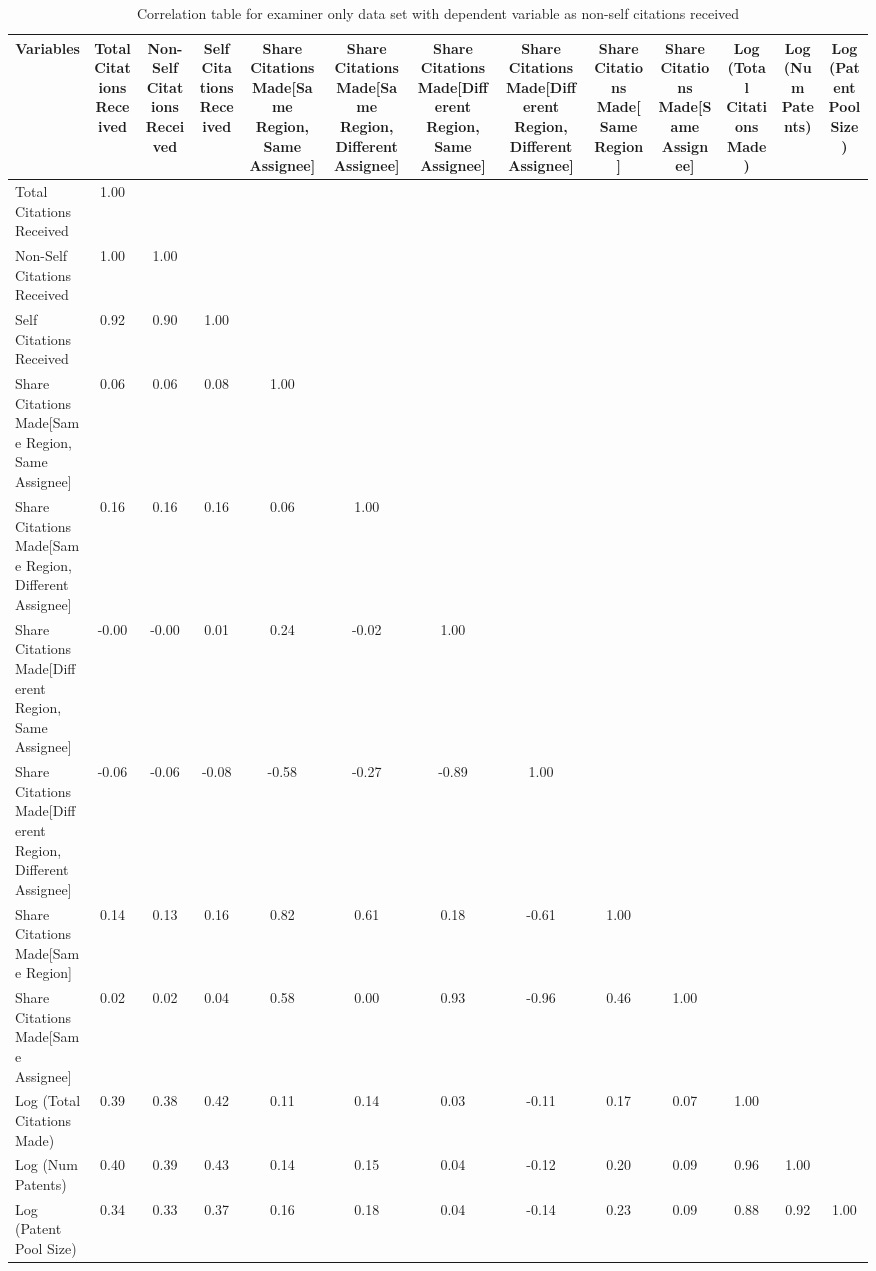 \begin{table}[htbp]\centering \caption{Correlation table for examiner only data set with dependent variable as non-self citations received \label{e.ncorrelation}}
\begin{tabular}{l  c  c  c  c  c  c  c  c  c  c  c  c }\hline\hline
\multicolumn{1}{c}{Variables} &Total Citations Received&Non-Self Citations Received&Self Citations Received&Share Citations Made[Same Region, Same Assignee]&Share Citations Made[Same Region, Different Assignee]&Share Citations Made[Different Region, Same Assignee]&Share Citations Made[Different Region, Different Assignee]&Share Citations Made[Same Region]&Share Citations Made[Same Assignee]&Log (Total Citations Made)&Log (Num Patents)&Log (Patent Pool Size)\\ \hline
Total Citations Received&1.00\\
Non-Self Citations Received&1.00&1.00\\
Self Citations Received&0.92&0.90&1.00\\
Share Citations Made[Same Region, Same Assignee]&0.06&0.06&0.08&1.00\\
Share Citations Made[Same Region, Different Assignee]&0.16&0.16&0.16&0.06&1.00\\
Share Citations Made[Different Region, Same Assignee]&-0.00&-0.00&0.01&0.24&-0.02&1.00\\
Share Citations Made[Different Region, Different Assignee]&-0.06&-0.06&-0.08&-0.58&-0.27&-0.89&1.00\\
Share Citations Made[Same Region]&0.14&0.13&0.16&0.82&0.61&0.18&-0.61&1.00\\
Share Citations Made[Same Assignee]&0.02&0.02&0.04&0.58&0.00&0.93&-0.96&0.46&1.00\\
Log (Total Citations Made)&0.39&0.38&0.42&0.11&0.14&0.03&-0.11&0.17&0.07&1.00\\
Log (Num Patents)&0.40&0.39&0.43&0.14&0.15&0.04&-0.12&0.20&0.09&0.96&1.00\\
Log (Patent Pool Size)&0.34&0.33&0.37&0.16&0.18&0.04&-0.14&0.23&0.09&0.88&0.92&1.00\\
\hline \hline 
 \end{tabular}
\end{table}
